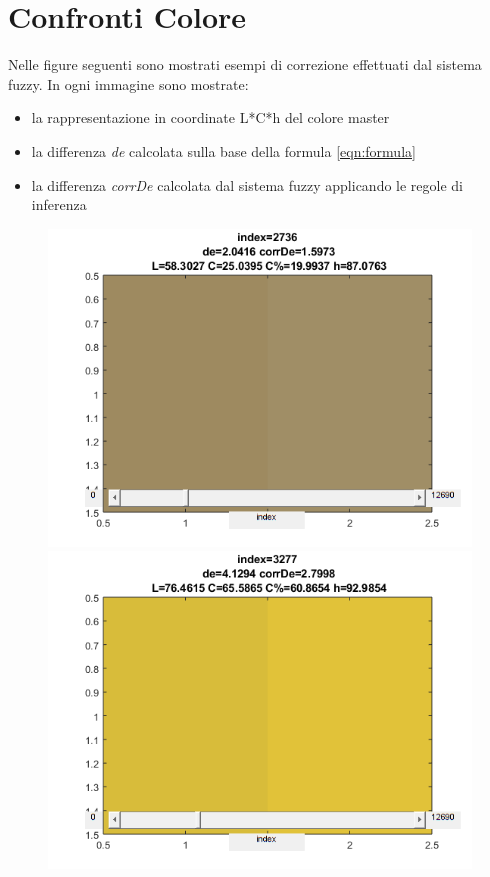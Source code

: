 \section{Confronti Colore}
Nelle figure seguenti sono mostrati esempi di correzione effettuati dal sistema fuzzy. In ogni immagine sono mostrate:
\begin{itemize}
 \item la rappresentazione in coordinate L*C*h del colore master 
 \item la differenza \textit{de} calcolata sulla base della formula \ref{eqn:formula}
 \item la differenza \textit{corrDe} calcolata dal sistema fuzzy applicando le regole di inferenza
\end{itemize}

\begin{figure}[!ht]
\begin{center}
	\includegraphics[scale=0.5]{images/1196.png}
	\includegraphics[scale=0.5]{images/3277.png}

\end{center}
\end{figure}
